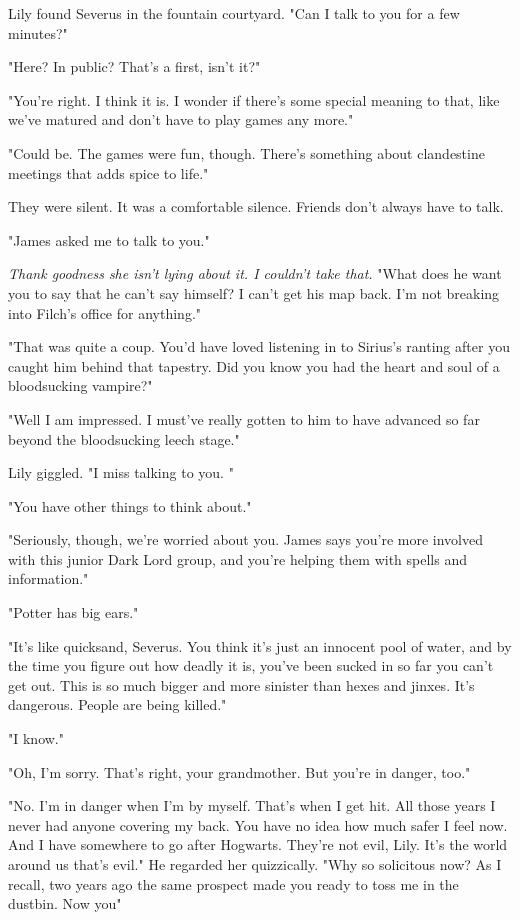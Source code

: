 Lily found Severus in the fountain courtyard. "Can I talk to you for a few minutes?"

"Here? In public? That's a first, isn't it?"

"You're right. I think it is. I wonder if there's some special meaning to that, like we've matured and don't have to play games any more."

"Could be. The games were fun, though. There's something about clandestine meetings that adds spice to life."

They were silent. It was a comfortable silence. Friends don't always have to talk.

"James asked me to talk to you."

\emph{Thank goodness she isn't lying about it. I couldn't take that.} "What does he want you to say that he can't say himself? I can't get his map back. I'm not breaking into Filch's office for anything."

"That was quite a coup. You'd have loved listening in to Sirius's ranting after you caught him behind that tapestry. Did you know you had the heart and soul of a bloodsucking vampire?"

"Well I am impressed. I must've really gotten to him to have advanced so far beyond the bloodsucking leech stage."

Lily giggled. "I miss talking to you. "

"You have other things to think about."

"Seriously, though, we're worried about you. James says you're more involved with this junior Dark Lord group, and you're helping them with spells and information."

"Potter has big ears."

"It's like quicksand, Severus. You think it's just an innocent pool of water, and by the time you figure out how deadly it is, you've been sucked in so far you can't get out. This is so much bigger and more sinister than hexes and jinxes. It's dangerous. People are being killed."

"I know."

"Oh, I'm sorry. That's right, your grandmother. But you're in danger, too."

"No. I'm in danger when I'm by myself. That's when I get hit. All those years I never had anyone covering my back. You have no idea how much safer I feel now. And I have somewhere to go after Hogwarts. They're not evil, Lily. It's the world around us that's evil." He regarded her quizzically. "Why so solicitous now? As I recall, two years ago the same prospect made you ready to toss me in the dustbin. Now you{\el}"

